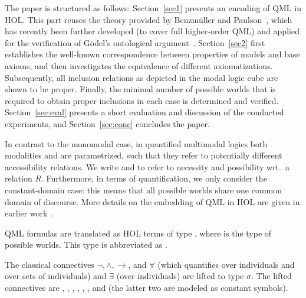 \begin{isabellebody}
\begin{isamarkuptext}
The paper is structured as follows: Section~\ref{sec1} presents an
encoding of QML in HOL. This part reuses the theory provided by
Benzm\"uller and Paulson~\cite{J23}, which has recently been further
developed (to cover full higher-order QML) and applied for the verification of
G\"odel's ontological argument~\cite{GoedelGod-AFP,ECAI}. Section~\ref{sec2}
first establishes the well-known correspondence between properties of models
and base axioms, and then investigates the equivalence of different axiomatizations.
Subsequently, all inclusion relations as depicted in the modal logic cube are shown to be proper. Finally, 
the minimal number of possible worlds that is required to obtain proper inclusions in each case 
is determined and verified. Section~\ref{sec:eval} presents a short evaluation and discussion of the 
conducted experiments, and Section~\ref{sec:conc} concludes the paper.%
\end{isamarkuptext}%
\isamarkuptrue%
%
\isamarkuptrue%
%
\begin{isamarkuptext}%
In contrast to the monomodal case, in quantified multimodal logics both modalities \isa{{\isasymbox}} and \isa{{\isasymdiamond}}
are parametrized, such that they refer to potentially different accessibility relations. We write
 and  to refer to necessity and possibility wrt.\ a relation $R$. Furthermore, in terms of quantification,
we only consider the constant-domain case: this means that all possible worlds share one common domain
of discourse. More details on the embedding of QML in HOL are given in earlier work~\cite{J23,ECAI}.%
\end{isamarkuptext}%
\isamarkuptrue%
%
\begin{isamarkuptext}%
QML formulas are translated as HOL terms of type , where  is the type of possible worlds.
This type is abbreviated as \isa{{\isasymsigma}}.%
\end{isamarkuptext}%
\isamarkuptrue%
%
\begin{isamarkuptext}%
The classical connectives $\neg, \wedge, \rightarrow$, and $\forall$
(which quantifies over individuals and over sets of individuals) and $\exists$ (over individuals) are
lifted to type $\sigma$. The lifted connectives are , , , 
, , \isa{{\isasymforall}}, and \isa{{\isasymexists}} (the latter two are modeled as constant symbols). 

\end{isamarkuptext}
\end{isabellebody}
